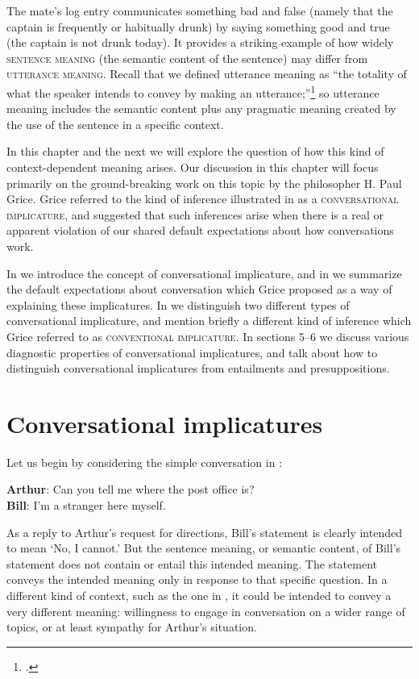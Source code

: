 The mate’s log entry communicates something bad and false (namely that the captain is frequently or habitually drunk) by saying something good and true (the captain is not drunk today). It provides a striking example of how widely \textsc{sentence meaning} (the semantic content of the sentence) may differ from \textsc{utterance meaning}. Recall that we defined utterance meaning as “the totality of what the speaker intends to convey by making an utterance;”\footnote{\citet[27]{Cruse2000}.} so utterance meaning includes the semantic content plus any pragmatic meaning created by the use of the sentence in a specific context.



In this chapter and the next we will explore the question of how this kind of context-dependent meaning arises. Our discussion in this chapter will focus primarily on the ground-breaking work on this topic by the philosopher H. Paul Grice. Grice referred to the kind of inference illustrated in  as a \textsc{conversational implicature}, and suggested that such inferences arise when there is a real or apparent violation of our shared default expectations about how conversations work.



In  we introduce the concept of conversational implicature, and in  we summarize the default expectations about conversation which Grice proposed as a way of explaining these implicatures. In  we distinguish two different types of conversational implicature, and mention briefly a different kind of inference which Grice referred to as \textsc{conventional implicature}. In sections 5–6 we discuss various diagnostic properties of conversational implicatures, and talk about how to distinguish conversational implicatures from entailments and presuppositions.


\section{Conversational implicatures}\label{sec:} %

Let us begin by considering the simple conversation in : 


\ea \label{ex:8.2}
\textbf{Arthur}: Can you tell me where the post office is?\\
\textbf{Bill}: I’m a stranger here myself.
\z


As a reply to Arthur’s request for directions, Bill’s statement is clearly intended to mean ‘No, I cannot.’ But the sentence meaning, or semantic content, of Bill’s statement does not contain or entail this intended meaning. The statement conveys the intended meaning only in response to that specific question. In a different kind of context, such as the one in , it could be intended to convey a very different meaning: willingness to engage in conversation on a wider range of topics, or at least sympathy for Arthur’s situation.


